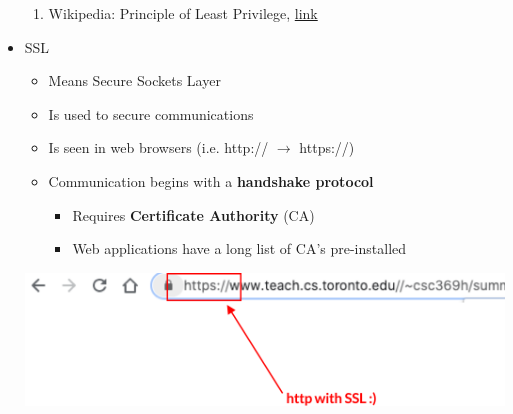 \documentclass[12pt]{article}
\begin{document}
\begin{itemize}
    \begin{enumerate}[1)]
        \item Wikipedia: Principle of Least Privilege, \href{https://en.wikipedia.org/wiki/Principle_of_least_privilege}{link}
    \end{enumerate}
    \item SSL
    \begin{itemize}
        \item Means Secure Sockets Layer
        \item Is used to secure communications
        \item Is seen in web browsers (i.e. http:// $\to$ https://)
        \item Communication begins with a \textbf{handshake protocol}
        \begin{itemize}
            \item Requires \textbf{Certificate Authority} (CA)
            \item Web applications have a long list of CA's pre-installed
        \end{itemize}
    \end{itemize}

    \begin{center}
        \includegraphics[width=\linewidth]{images/week_11_notes_1_6.png}
    \end{center}
\end{itemize}
\end{document}

